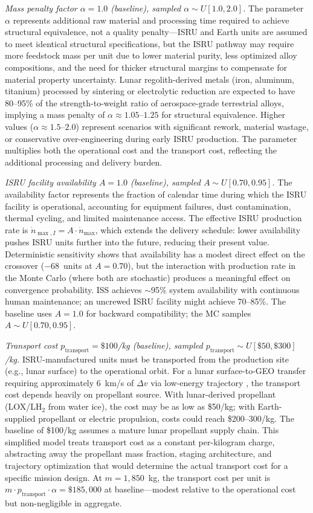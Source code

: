 \documentclass[preprint,12pt]{elsarticle}
\begin{document}
\emph{Mass penalty factor $\alpha = 1.0$ (baseline), sampled $\alpha \sim U[1.0, 2.0]$.} The parameter $\alpha$ represents additional raw material and processing time required to achieve structural equivalence, not a quality penalty---ISRU and Earth units are assumed to meet identical structural specifications, but the ISRU pathway may require more feedstock mass per unit due to lower material purity, less optimized alloy compositions, and the need for thicker structural margins to compensate for material property uncertainty. Lunar regolith-derived metals (iron, aluminum, titanium) processed by sintering or electrolytic reduction are expected to have 80--95\% of the strength-to-weight ratio of aerospace-grade terrestrial alloys, implying a mass penalty of $\alpha \approx 1.05$--$1.25$ for structural equivalence. Higher values ($\alpha \approx 1.5$--$2.0$) represent scenarios with significant rework, material wastage, or conservative over-engineering during early ISRU production. The parameter multiplies both the operational cost and the transport cost, reflecting the additional processing and delivery burden.

\emph{ISRU facility availability $A = 1.0$ (baseline), sampled $A \sim U[0.70, 0.95]$.} The availability factor represents the fraction of calendar time during which the ISRU facility is operational, accounting for equipment failures, dust contamination, thermal cycling, and limited maintenance access. The effective ISRU production rate is $\dot{n}_{\max,I} = A \cdot \dot{n}_{\max}$, which extends the delivery schedule: lower availability pushes ISRU units further into the future, reducing their present value. Deterministic sensitivity shows that availability has a modest direct effect on the crossover ($-$68~units at $A = 0.70$), but the interaction with production rate in the Monte Carlo (where both are stochastic) produces a meaningful effect on convergence probability. ISS achieves $\sim$95\% system availability with continuous human maintenance; an uncrewed ISRU facility might achieve 70--85\%. The baseline uses $A = 1.0$ for backward compatibility; the MC samples $A \sim U[0.70, 0.95]$.

\emph{Transport cost $p_{\mathrm{transport}} = \$100$/kg (baseline), sampled $p_{\mathrm{transport}} \sim U[\$50, \$300]$/kg.} ISRU-manufactured units must be transported from the production site (e.g., lunar surface) to the operational orbit. For a lunar surface-to-GEO transfer requiring approximately 6~km/s of $\Delta v$ via low-energy trajectory \cite{ishimatsu2016}, the transport cost depends heavily on propellant source. With lunar-derived propellant (LOX/LH$_2$ from water ice), the cost may be as low as \$50/kg; with Earth-supplied propellant or electric propulsion, costs could reach \$200--300/kg. The baseline of \$100/kg assumes a mature lunar propellant supply chain. This simplified model treats transport cost as a constant per-kilogram charge, abstracting away the propellant mass fraction, staging architecture, and trajectory optimization that would determine the actual transport cost for a specific mission design. At $m = 1{,}850$~kg, the transport cost per unit is $m \cdot p_{\mathrm{transport}} \cdot \alpha = \$185{,}000$ at baseline---modest relative to the operational cost but non-negligible in aggregate.
\end{document}
